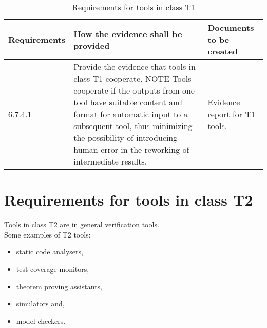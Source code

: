 \documentclass{template/openetcs_report}
\begin{document}
{\footnotesize\sffamily\centering
\begin{longtable}{|p{2cm}|p{9cm}|p{3cm}|}
\caption{Requirements for tools in class T1}\\
\hline
\bfseries Requirements & \bfseries How the evidence shall be provided & \bfseries Documents to be created\\
\hline
\hline
\endhead
\hline
\endfoot

6.7.4.1 & Provide the evidence that tools in class T1 cooperate.
\linebreak
\linebreak
NOTE \linebreak
Tools cooperate if the outputs from one tool have suitable content and format for automatic input to a subsequent tool, thus minimizing the possibility of introducing human error in the reworking of intermediate results. & Evidence report for T1 tools.\\ 
\hline

\end{longtable}}



\section{Requirements for tools in class T2}
\label{T2}
Tools in class T2 are in general verification tools.\\
Some examples of T2 tools:
\begin{itemize}\itemsep=0pt
  \item static code analysers,
  \item test coverage monitors,
  \item theorem proving assistants,
  \item simulators and,
  \item model checkers.
\end{itemize}
\end{document}
